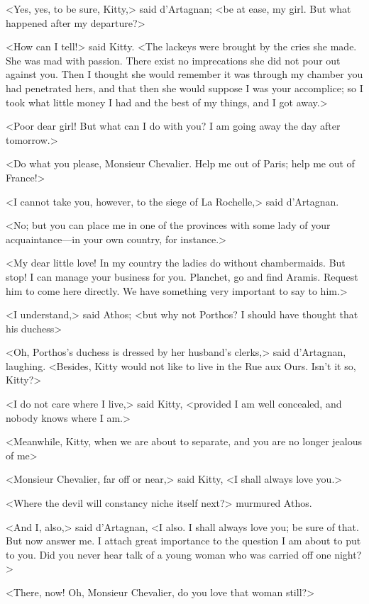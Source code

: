 <Yes, yes, to be sure, Kitty,> said d'Artagnan; <be at ease, my girl. But what happened after my departure?> 

<How can I tell!> said Kitty. <The lackeys were brought by the cries she made. She was mad with passion. There exist no imprecations she did not pour out against you. Then I thought she would remember it was through my chamber you had penetrated hers, and that then she would suppose I was your accomplice; so I took what little money I had and the best of my things, and I got away.>

<Poor dear girl! But what can I do with you? I am going away the day after tomorrow.> 

<Do what you please, Monsieur Chevalier. Help me out of Paris; help me out of France!> 

<I cannot take you, however, to the siege of La Rochelle,> said d'Artagnan. 

<No; but you can place me in one of the provinces with some lady of your acquaintance---in your own country, for instance.> 

<My dear little love! In my country the ladies do without chambermaids. But stop! I can manage your business for you. Planchet, go and find Aramis. Request him to come here directly. We have something very important to say to him.> 

<I understand,> said Athos; <but why not Porthos? I should have thought that his duchess\longdash> 

<Oh, Porthos's duchess is dressed by her husband's clerks,> said d'Artagnan, laughing. <Besides, Kitty would not like to live in the Rue aux Ours. Isn't it so, Kitty?> 

<I do not care where I live,> said Kitty, <provided I am well concealed, and nobody knows where I am.> 

<Meanwhile, Kitty, when we are about to separate, and you are no longer jealous of me\longdash> 

<Monsieur Chevalier, far off or near,> said Kitty, <I shall always love you.> 

<Where the devil will constancy niche itself next?> murmured Athos. 

<And I, also,> said d'Artagnan, <I also. I shall always love you; be sure of that. But now answer me. I attach great importance to the question I am about to put to you. Did you never hear talk of a young woman who was carried off one night?> 

<There, now! Oh, Monsieur Chevalier, do you love that woman still?> 

